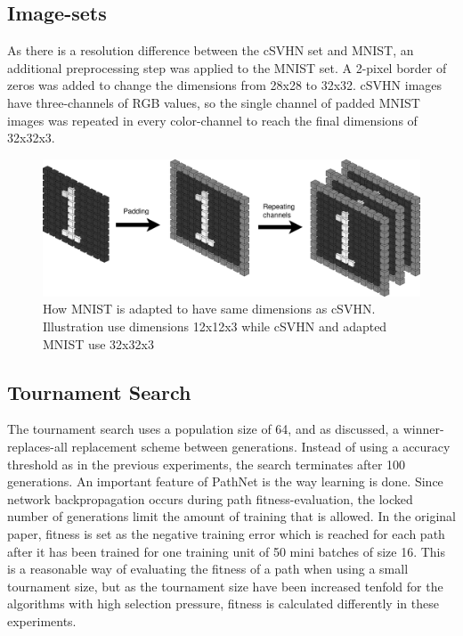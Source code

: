\subsection{Image-sets}
As there is a resolution difference between the cSVHN set and MNIST, an additional preprocessing step was applied to the MNIST set. A 2-pixel border of zeros was added to change the dimensions from 28x28 to 32x32. cSVHN images have three-channels of RGB values, so the single channel of padded MNIST images was repeated in every color-channel to reach the final dimensions of 32x32x3.  

\begin{figure}[ht]
    \includegraphics[width=\textwidth]{Chapters/4.Experiments/exp2/figures/MNISTpadding+repeating.png}
    \caption[MNIST modifications]{How MNIST is adapted to have same dimensions as cSVHN. Illustration use dimensions 12x12x3 while cSVHN and adapted MNIST use 32x32x3}
    \label{fig:MNISTpadding}
\end{figure}

\subsection{Tournament Search}\label{exp2:implementation.search}
The tournament search uses a population size of 64, and as discussed, a winner-replaces-all replacement scheme between generations. Instead of using a accuracy threshold as in the previous experiments, the search terminates after 100 generations. An important feature of PathNet is the way learning is done. Since network backpropagation occurs during path fitness-evaluation, the locked number of generations limit the amount of training that is allowed. In the original paper, fitness is set as the negative training error which is reached for each path after it has been trained for one training unit of 50 mini batches of size 16. This is a reasonable way of evaluating the fitness of a path when using a small tournament size, but as the tournament size have been increased tenfold for the algorithms with high selection pressure, fitness is calculated differently in these experiments. 

